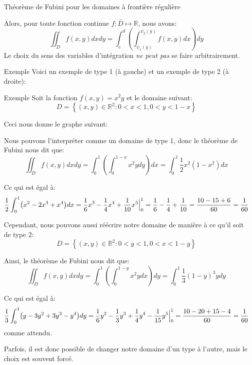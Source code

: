 \documentclass[a4paper]{article}
\begin{document}
\begin{parag}{Théorème de Fubini pour les domaines à frontière régulière}
\begin{enumerate}[left=0pt]
            Alors, pour toute fonction continue $f: \bar{D} \mapsto \mathbb{R}$, nous avons: 
            \[\iint_D f\left(x, y\right)dxdy = \int_{c}^{d} \left(\int_{\psi_1\left(y\right)}^{\psi_2\left(y\right)} f\left(x, y\right)dx\right)dy\]
            Le choix du sens des variables d'intégration \textit{ne peut pas} se faire arbitrairement.
    \end{enumerate}

    \begin{subparag}{Exemple}
        Voici un exemple de type 1 (à gauche) et un exemple de type 2 (à droite):
    \end{subparag}
\end{parag}

\begin{parag}{Exemple}
    Soit la fonction $f\left(x, y\right) = x^2 y$ et le domaine suivant: 
    \[D = \left\{\left(x, y\right) \in \mathbb{R}^2 : 0 < x < 1, 0 < y < 1 - x\right\}\]
    
    Ceci nous donne le graphe suivant:

    Nous pouvons l'interpréter comme un domaine de type 1, donc le théorème de Fubini nous dit que: 
    \[\iint_D f\left(x,y\right)dxdy = \int_{0}^{1} \left(\int_{0}^{1 - x}  x^2 y dy\right)dx = \int_{0}^{1} \frac{1}{2}x^2 \left(1 - x^2\right)dx\]

    Ce qui est égal à: 
    \[\frac{1}{2} \int_{0}^{1} \left(x^2 - 2x^3 + x^4\right)dx = \frac{1}{6} x^3 - \frac{1}{4}x^4 + \frac{1}{10}x^5 \eval_{0}^{1} = \frac{1}{6}- \frac{1}{4} + \frac{1}{10} = \frac{10 - 15 + 6}{60} = \frac{1}{60}\]
    
    
    Cependant, nous pouvons aussi réécrire notre domaine de manière à ce qu'il soit de type 2: 
    \[D = \left\{\left(x, y\right) \in \mathbb{R}^2 : 0 < y < 1, 0 < x < 1 - y\right\}\]
    
    Ainsi, le théorème de Fubini nous dit que: 
    \[\iint_D f\left(x, y\right)dxdy = \int_{0}^{1} \left(\int_{0}^{1 -y} x^2 y dx\right)dy = \int_{0}^{1} \frac{1}{3}\left(1-y\right)^3 ydy\]
    
    Ce qui est égal à:
    \[\frac{1}{3} \int_{0}^{1} \left(y - 3y^2 + 3y^3 - y^4\right)dy = \frac{1}{6}y^2 - \frac{1}{3}y^3 + \frac{1}{4}y^4 - \frac{1}{15}y^5 \eval_{0}^{1} = \frac{10 - 20 + 15 - 4}{60} = \frac{1}{60}\]
    comme attendu.

    Parfois, il est donc possible de changer notre domaine d'un type à l'autre, mais le choix est souvent forcé.
\end{parag}
\end{document}

